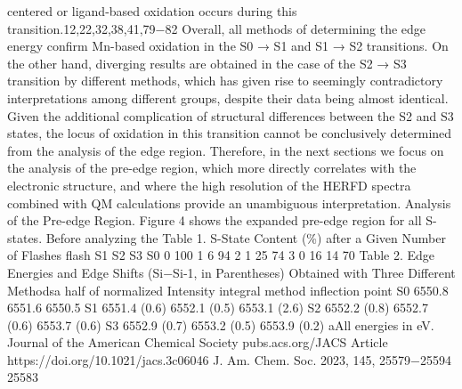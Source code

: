 \documentclass{article}
\begin{document}
centered or ligand-based oxidation occurs during this
transition.12,22,32,38,41,79−82
Overall, all methods of determining the edge energy confirm
Mn-based oxidation in the S0 → S1 and S1 → S2 transitions. On
the other hand, diverging results are obtained in the case of the
S2 → S3 transition by different methods, which has given rise to
seemingly contradictory interpretations among different
groups, despite their data being almost identical. Given the
additional complication of structural differences between the S2
and S3 states, the locus of oxidation in this transition cannot be
conclusively determined from the analysis of the edge region.
Therefore, in the next sections we focus on the analysis of the
pre-edge region, which more directly correlates with the
electronic structure, and where the high resolution of the
HERFD spectra combined with QM calculations provide an
unambiguous interpretation.
Analysis of the Pre-edge Region. Figure 4 shows the
expanded pre-edge region for all S-states. Before analyzing the
Table 1. S-State Content (\%) after a Given Number of
Flashes
flash
S1
S2
S3
S0
0
100
1
6
94
2
1
25
74
3
0
16
14
70
Table 2. Edge Energies and Edge Shifts (Si−Si‑1, in
Parentheses) Obtained with Three Different Methodsa
half of normalized Intensity
integral method
inflection point
S0
6550.8
6551.6
6550.5
S1
6551.4 (0.6)
6552.1 (0.5)
6553.1 (2.6)
S2
6552.2 (0.8)
6552.7 (0.6)
6553.7 (0.6)
S3
6552.9 (0.7)
6553.2 (0.5)
6553.9 (0.2)
aAll energies in eV.
Journal of the American Chemical Society
pubs.acs.org/JACS
Article
https://doi.org/10.1021/jacs.3c06046
J. Am. Chem. Soc. 2023, 145, 25579−25594
25583

\newpage

\end{document}
